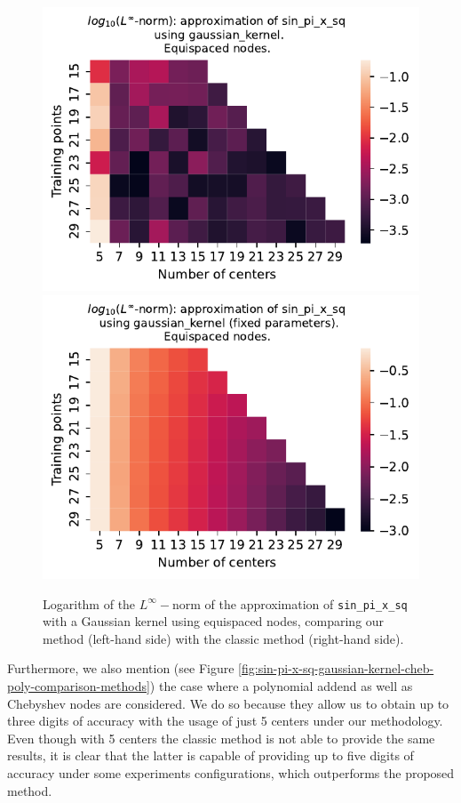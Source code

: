 \documentclass[12pt]{report} %
\begin{document}
\begin{figure}[ht]
    \centering
    \includegraphics[width=.49\textwidth]{imagenes/experiments/1d/variational/sin_pi_x_sq-Kgaussian_kernel-Equi.pdf}
    \includegraphics[width=.49\textwidth]{imagenes/experiments/1d/least_squares/opt-sin_pi_x_sq-Kgaussian_kernel-Equi.pdf}
    \caption{Logarithm of the $L^\infty-$norm of the approximation of \texttt{sin\_pi\_x\_sq} with a Gaussian kernel using equispaced nodes, comparing our method (left-hand side) with the classic method (right-hand side).}
    \label{fig:sin-pi-x-sq-gaussian-kernel-comparison-methods}
\end{figure}

Furthermore, we also mention (see Figure \ref{fig:sin-pi-x-sq-gaussian-kernel-cheb-poly-comparison-methods}) the case where a polynomial addend as well as Chebyshev nodes are considered. We do so because they allow us to obtain up to three digits of accuracy with the usage of just 5 centers under our methodology. Even though with 5 centers the classic method is not able to provide the same results, it is clear that the latter is capable of providing up to five digits of accuracy under some experiments configurations, which outperforms the proposed method.
\end{document}
